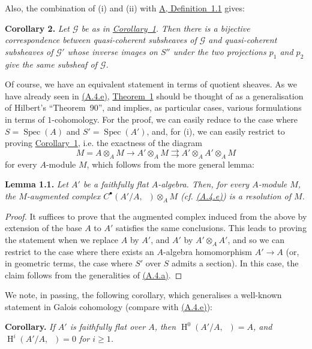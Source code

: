 \documentclass{article}
\newenvironment{itenv}[1]
  {\phantomsection\par\medskip\noindent\textbf{#1.}\itshape}
  {\medskip}
\newcommand{\scr}[1]{{\mathscr{#1}}}
\renewcommand{\geq}{\geqslant}
\DeclareMathOperator{\HH}{H}
\DeclareMathOperator{\Ga}{G_a}
\DeclareMathOperator{\Spec}{Spec}
\begin{document}
Also, the combination of (i) and (ii) with \hyperref[definition:A.1.1]{A, Definition~1.1} gives:

\begin{itenv}{Corollary 2}
\label{corollary:B.1(2)}
  Let $\scr{G}$ be as in \hyperref[corollary:B.1(1)]{Corollary~1}.
  Then there is a bijective correspondence between quasi-coherent subsheaves of $\scr{G}$ and quasi-coherent subsheaves of $\scr{G}'$ whose inverse images on $S''$ under the two projections $p_1$ and $p_2$ give the same subsheaf of $\scr{G}$.
\end{itenv}

Of course, we have an equivalent statement in terms of quotient sheaves.
As we have already seen in \hyperref[A.4.e]{(A.4.e)}, \hyperref[theorem:B.1(1)]{Theorem~1} should be thought of as a generalisation of Hilbert's ``Theorem~90'', and implies, as particular cases, various formulations in terms of $1$-cohomology.
For the proof, we can easily reduce to the case where $S=\Spec(A)$ and $S'=\Spec(A')$, and, for (i), we can easily restrict to proving \hyperref[corollary:B.1(1)]{Corollary~1}, i.e. the exactness of the diagram
\[
  M
  = A\otimes_A M
  \to A'\otimes_A M
  \rightrightarrows A'\otimes_A A'\otimes_A M
\]
for every $A$-module $M$, which follows from the more general lemma:

\begin{itenv}{Lemma 1.1}
  Let $A'$ be a faithfully flat $A$-algebra.
  Then, for every $A$-module $M$, the $M$-augmented complex $C^\bullet(A'/A,\Ga)\otimes_A M$ (cf. \hyperref[A.4.e]{(A.4.e)}) is a \emph{resolution} of $M$.
\end{itenv}

\begin{proof}
  It suffices to prove that the augmented complex induced from the above by extension of the base $A$ to $A'$ satisfies the same conclusions.
  This leads to proving the statement when we replace $A$ by $A'$, and $A'$ by $A'\otimes_A A'$, and so we can restrict to the case where there exists an $A$-algebra homomorphism $A'\to A$ (or, in geometric terms, the case where $S'$ over $S$ admits a section).
  In this case, the claim follows from the generalities of \hyperref[A.4.a]{(A.4.a)}.
\end{proof}

We note, in passing, the following corollary, which generalises a well-known statement in Galois cohomology (compare with \hyperref[A.4.e]{(A.4.e)}):

\begin{itenv}{Corollary}
  If $A'$ is faithfully flat over $A$, then $\HH^0(A'/A,\Ga)=A$, and $\HH^i(A'/A,\Ga)=0$ for $i\geq1$.
\end{itenv}
\end{document}
